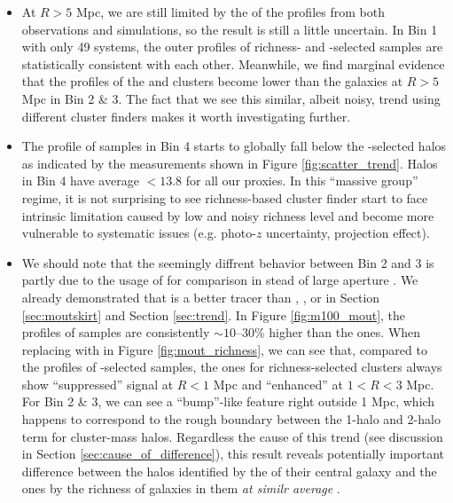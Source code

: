 \documentclass[a4paper,fleqn,usenatbib]{mnras}
\begin{document}
\begin{itemize}
        \item At $R > 5$ Mpc, we are still limited by the \snratio{} of the \dsigma{} profiles 
            from both observations and simulations, so the result is still a little uncertain.
            In Bin 1 with only 49 systems, the outer \dsigma{} profiles of richness- and 
            -selected samples are statistically consistent with each other.
            Meanwhile, we find marginal evidence that the \dsigma{} profiles of the \redm{} and 
            \camira{} clusters become lower than the  galaxies at $R > 5$ Mpc 
            in Bin 2 \& 3. 
            The fact that we see this similar, albeit noisy, trend using different cluster finders
            makes it worth investigating further.

        \item The \dsigma{} profile of \redm{} samples in Bin 4 starts to globally fall below the 
            -selected halos as indicated by the \sigmh{} measurements shown in 
            Figure \ref{fig:scatter_trend}.
            Halos in Bin 4 have average \logmh{}$<13.8$ for all our \mvir{} proxies. 
            In this ``massive group'' regime, it is not surprising to see richness-based cluster
            finder start to face intrinsic limitation caused by low and noisy richness level 
            and become more vulnerable to systematic issues (e.g. photo-$z$ uncertainty, 
            projection effect).
        
        \item We should note that the seemingly diffrent behavior between Bin 2 and 3 is partly
            due to the usage of  for comparison in stead of large aperture \mstar{}.
            We already demonstrated that  is a better \mvir{} tracer than ,
            , or \mmax{} in Section \ref{sec:moutskirt} and Section \ref{sec:trend}.
            In Figure \ref{fig:m100_mout}, the \dsigma{} profiles of  samples are 
            consistently $\sim 10$--30\% higher than the  ones.
            When replacing  with  in Figure \ref{fig:mout_richness}, 
            we can see that, compared to the \dsigma{} profiles of \mstar{}-selected samples, 
            the ones for richness-selected clusters always show ``suppressed'' signal at 
            $R < 1$ Mpc and ``enhanced'' \dsigma{} at $1 < R < 3$ Mpc.
            For Bin 2 \& 3, we can see a ``bump''-like feature right outside 1 Mpc, which happens
            to correspond to the rough boundary between the 1-halo and 2-halo term for cluster-mass
            halos. 
            Regardless the cause of this trend (see discussion in Section 
            \ref{sec:cause_of_difference}), this result reveals potentially important difference 
            between the halos identified by the \mstar{} of their central galaxy and the ones 
            by the richness of galaxies in them \emph{at similr average \mvir{}}.


\end{itemize}
\end{document}
